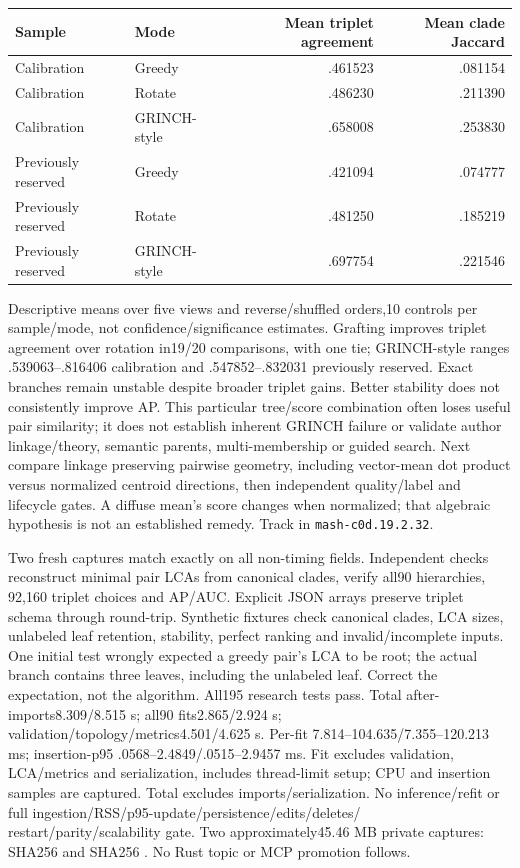 \documentclass[11pt]{article}
\begin{document}
\begin{center}
\small
\begin{tabular}{llrr}
\toprule
Sample & Mode & Mean triplet agreement & Mean clade Jaccard \\
\midrule
Calibration & Greedy & .461523 & .081154 \\
Calibration & Rotate & .486230 & .211390 \\
Calibration & GRINCH-style & .658008 & .253830 \\
Previously reserved & Greedy & .421094 & .074777 \\
Previously reserved & Rotate & .481250 & .185219 \\
Previously reserved & GRINCH-style & .697754 & .221546 \\
\bottomrule
\end{tabular}
\end{center}
Descriptive means over five views and reverse/shuffled orders,10 controls per
sample/mode, not confidence/significance estimates. Grafting improves triplet
agreement over rotation in19/20 comparisons, with one tie; GRINCH-style ranges
.539063--.816406 calibration and .547852--.832031 previously reserved. Exact
branches remain unstable despite broader triplet gains. Better stability does
not consistently improve AP. This particular tree/score combination often loses
useful pair similarity; it does not establish inherent GRINCH failure or validate
author linkage/theory, semantic parents, multi-membership or guided search.
Next compare linkage preserving pairwise geometry, including vector-mean dot
product versus normalized centroid directions, then independent quality/label
and lifecycle gates. A diffuse mean's score changes when normalized; that
algebraic hypothesis is not an established remedy. Track in \texttt{mash-c0d.19.2.32}.

Two fresh captures match exactly on all non-timing fields. Independent checks
reconstruct minimal pair LCAs from canonical clades, verify all90 hierarchies,
92,160 triplet choices and AP/AUC. Explicit JSON arrays preserve triplet schema
through round-trip. Synthetic fixtures check canonical clades, LCA sizes, unlabeled
leaf retention, stability, perfect ranking and invalid/incomplete inputs. One
initial test wrongly expected a greedy pair's LCA to be root; the actual branch
contains three leaves, including the unlabeled leaf. Correct the expectation,
not the algorithm. All195 research tests pass. Total after-imports8.309/8.515 s;
all90 fits2.865/2.924 s; validation/topology/metrics4.501/4.625 s. Per-fit
7.814--104.635/7.355--120.213 ms; insertion-p95 .0568--2.4849/.0515--2.9457 ms.
Fit excludes validation, LCA/metrics and serialization, includes thread-limit
setup; CPU and insertion samples are captured. Total excludes imports/serialization.
No inference/refit or full ingestion/RSS/p95-update/persistence/edits/deletes/
restart/parity/scalability gate. Two approximately45.46 MB private captures:
 SHA256
and  SHA256
.
No Rust topic or MCP promotion follows.
\end{document}
